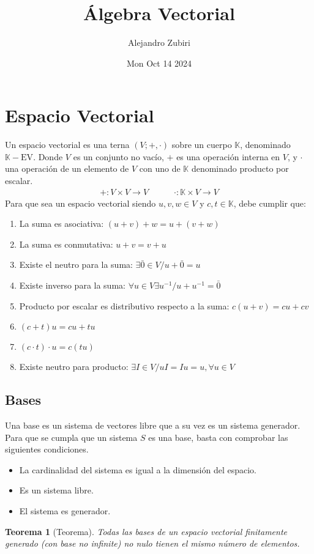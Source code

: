 \documentclass{article}
\author{Alejandro Zubiri}
\date{Mon Oct 14 2024}
\title{Álgebra Vectorial}
\newtheorem*{bases_n_vectores}{Teorema}
\begin{document}
\maketitle
\tableofcontents
\pagebreak
\section{Espacio Vectorial}
Un espacio vectorial es una terna $(V; +,\cdot )$ sobre un cuerpo $\mathbb{K}$, denominado
$\mathbb{K}-\text{EV}$. Donde $V$ es un conjunto no vacío, $+$ es una operación interna en $V$,
y $\cdot $ una operación de un elemento de $V$ con uno de $\mathbb{K}$ denominado producto por
escalar.
\begin{equation}
    \begin{split}
        +: V\times V \to V\quad\quad\quad \cdot : \mathbb{K}\times V \to V
    \end{split}
\end{equation}
Para que sea un espacio vectorial siendo $u,v,w \in V$ y $c,t \in  \mathbb{K}$, debe cumplir que:
\begin{enumerate}
    \item La suma es asociativa: $(u+v)+w=u+(v+w)$
    \item La suma es conmutativa: $u+v=v+u$
    \item Existe el neutro para la suma: $\exists \bar{0} \in V / u+ \bar{0}=u$
    \item Existe inverso para la suma: $\forall u \in V \exists u^{-1} / u+u^{-1}=\bar{0}$
    \item Producto por escalar es distributivo respecto a la suma: $c(u+v)=cu+cv$
    \item $(c+t)u=cu+tu$
    \item $(c\cdot t)\cdot u=c(tu)$
    \item Existe neutro para producto: $\exists I \in V / uI=Iu=u,\forall u \in V$
\end{enumerate}
\subsection{Bases}
Una base es un sistema de vectores libre que a su vez es un sistema generador. Para que se cumpla
que un sistema $S$ es una base, basta con comprobar las siguientes condiciones.
\begin{itemize}
    \item La cardinalidad del sistema es igual a la dimensión del espacio.
    \item Es un sistema libre.
    \item El sistema es generador.
\end{itemize}
\begin{bases_n_vectores}[Teorema]
    Todas las bases de un espacio vectorial finitamente generado (con base no infinite) no nulo
    tienen el mismo número de elementos.
\end{bases_n_vectores}
\end{document}
